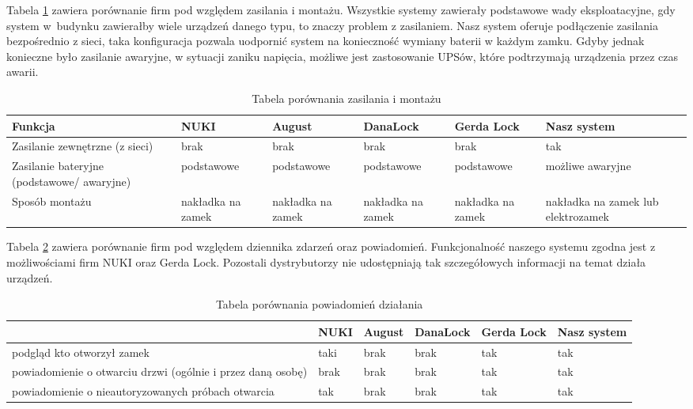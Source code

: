  	Tabela \ref{tab:porownanie2} zawiera porównanie firm pod względem zasilania i montażu. Wszystkie systemy zawierały podstawowe wady eksploatacyjne, gdy system w~budynku zawierałby wiele urządzeń danego typu, to znaczy problem z zasilaniem. Nasz system oferuje podłączenie zasilania bezpośrednio z sieci, taka konfiguracja pozwala uodpornić system na konieczność wymiany baterii w każdym zamku. Gdyby jednak konieczne było zasilanie awaryjne, w sytuacji zaniku napięcia, możliwe jest zastosowanie UPSów, które podtrzymają urządzenia przez czas awarii.
 \begin{longtable}[!ht]{|m{5cm}|m{1.7cm}|m{1.7cm}|m{1.7cm}|m{2cm}|m{2.4cm}|} 
 	\caption{Tabela porównania zasilania i montażu}
 	\label{tab:porownanie2}\\
 	\hline	
 	Funkcja & NUKI & August &DanaLock & Gerda Lock & Nasz system \\	\hline
 	Zasilanie zewnętrzne (z sieci)	
 	& brak & brak & brak & brak & tak \\	\hline
	 Zasilanie bateryjne \newline (podstawowe/ awaryjne)	
	 & podstawowe & podstawowe &podstawowe & podstawowe & możliwe \newline awaryjne \\	\hline
 	Sposób montażu	
 	& nakładka na \linebreak zamek & nakładka na \linebreak zamek & nakładka na \linebreak zamek & nakładka na \linebreak zamek & nakładka na \newline zamek lub  \newline elektrozamek  \\	\hline
 \end{longtable}
 
Tabela \ref{tab:porownanie3} zawiera porównanie firm pod względem dziennika zdarzeń oraz powiadomień. Funkcjonalność naszego systemu zgodna jest z możliwościami firm NUKI oraz Gerda Lock. Pozostali dystrybutorzy nie udostępniają tak szczegółowych informacji na temat działa urządzeń.
\begin{longtable}[!ht]{|m{6cm}|m{1.4cm}|m{1.4cm}|m{1.7cm}|m{2cm}|m{2cm}|} 
	\caption{Tabela porównania powiadomień działania}
	\label{tab:porownanie3}\\
	\hline	
	& NUKI & August & DanaLock & Gerda Lock & Nasz system \\	\hline
	podgląd kto otworzył zamek
	& taki & brak & brak & tak & tak \\	\hline
	powiadomienie o otwarciu drzwi \newline (ogólnie i przez daną osobę)
	& brak & brak & brak & tak & tak  \\	\hline
	powiadomienie o nieautoryzowanych próbach otwarcia
	& tak & brak & brak & tak & tak  \\	\hline
\end{longtable}

